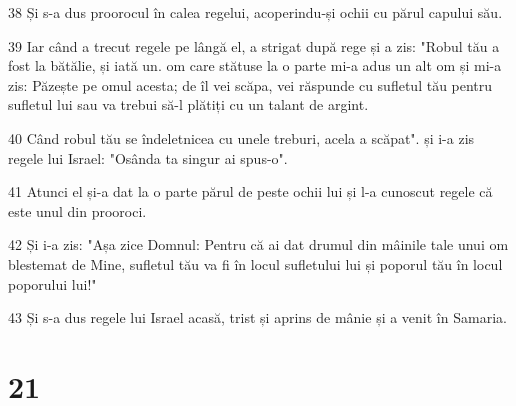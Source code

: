\par 38 Și s-a dus proorocul în calea regelui, acoperindu-și ochii cu părul capului său.
\par 39 Iar când a trecut regele pe lângă el, a strigat după rege și a zis: "Robul tău a fost la bătălie, și iată un. om care stătuse la o parte mi-a adus un alt om și mi-a zis: Păzește pe omul acesta; de îl vei scăpa, vei răspunde cu sufletul tău pentru sufletul lui sau va trebui să-l plătiți cu un talant de argint.
\par 40 Când robul tău se îndeletnicea cu unele treburi, acela a scăpat". și i-a zis regele lui Israel: "Osânda ta singur ai spus-o".
\par 41 Atunci el și-a dat la o parte părul de peste ochii lui și l-a cunoscut regele că este unul din prooroci.
\par 42 Și i-a zis: "Așa zice Domnul: Pentru că ai dat drumul din mâinile tale unui om blestemat de Mine, sufletul tău va fi în locul sufletului lui și poporul tău în locul poporului lui!"
\par 43 Și s-a dus regele lui Israel acasă, trist și aprins de mânie și a venit în Samaria.

\chapter{21}

